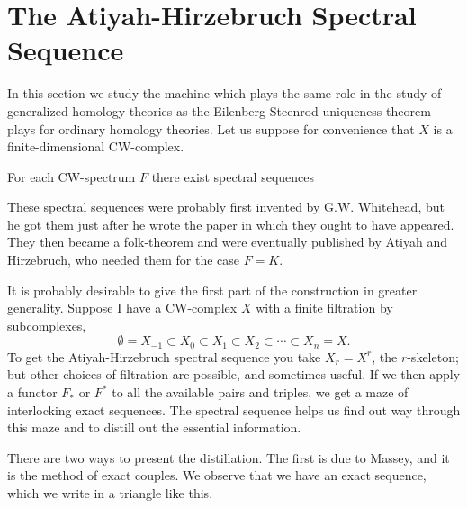 \documentclass[../main]{subfiles}
\begin{document}
\label{sec:p3c07}


\chapter{The Atiyah-Hirzebruch Spectral Sequence}
In this section we study the machine which plays the same role in the study of generalized homology theories as the Eilenberg-Steenrod uniqueness theorem plays for ordinary homology theories. Let us suppose for convenience that $X$ is a finite-dimensional CW-complex.


\begin{theorem*}
For each CW-spectrum $F$ there exist spectral sequences 
\begin{center}
\end{center}
\end{theorem*}

These spectral sequences were probably first invented by G.W. Whitehead, but he got them just after he wrote the paper \cite{whitehead2} in which they ought to have appeared. They then became a folk-theorem and were eventually published by Atiyah and Hirzebruch, who needed them for the case $F=K$.

It is probably desirable to give the first part of the construction in greater generality. Suppose I have a CW-complex $X$ with a finite filtration by subcomplexes,
\begin{equation*}
    \emptyset=X_{-1}\subset X_0\subset X_1\subset X_2\subset\cdots\subset X_n=X.
\end{equation*}
To get the Atiyah-Hirzebruch spectral sequence you take $X_r=X^r$, the $r$-skeleton; but other choices of filtration are possible, and sometimes useful. If we then apply a functor $F_{\ast}$ or $F^{\ast}$ to all the available pairs and triples, we get a maze of interlocking exact sequences. The spectral sequence helps us find out way through this maze and to distill out the essential information.

There are two ways to present the distillation. The first is due to Massey, and it is the method of exact couples. We observe that we have an exact sequence, which we write in a triangle like this.
\begin{center}
\end{center}
\end{document}
